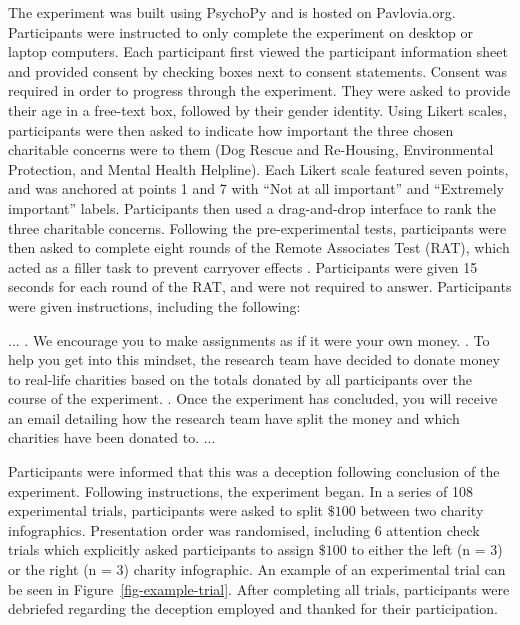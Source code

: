 \documentclass[
  authoryear,
  preprint,
  3p]{elsarticle}
\begin{document}
The experiment was built using PsychoPy \citep{peirce_2019} and is
hosted on Pavlovia.org. Participants were instructed to only complete
the experiment on desktop or laptop computers. Each participant first
viewed the participant information sheet and provided consent by
checking boxes next to consent statements. Consent was required in order
to progress through the experiment. They were asked to provide their age
in a free-text box, followed by their gender identity. Using Likert
scales, participants were then asked to indicate how important the three
chosen charitable concerns were to them (Dog Rescue and Re-Housing,
Environmental Protection, and Mental Health Helpline). Each Likert scale
featured seven points, and was anchored at points 1 and 7 with ``Not at
all important'' and ``Extremely important'' labels. Participants then
used a drag-and-drop interface to rank the three charitable concerns.
Following the pre-experimental tests, participants were then asked to
complete eight rounds of the Remote Associates Test (RAT), which acted
as a filler task to prevent carryover effects \citep{she_2023}.
Participants were given 15 seconds for each round of the RAT, and were
not required to answer. Participants were given instructions, including
the following:

\hspace{0pt}
\begin{tcolorbox}[colback=gray!10, colframe=gray!50, boxrule=0.5pt]
...
. We encourage you to make assignments as if it were your own money.
  . To help you get into this mindset, the research team have decided to donate money to real-life charities based on the totals donated by all participants over the course of the experiment.
  . Once the experiment has concluded, you will receive an email detailing how the research team have split the money and which charities have been donated to.
  \newline
  ...
\end{tcolorbox}
\hspace{0pt}

Participants were informed that this was a deception following
conclusion of the experiment. Following instructions, the experiment
began. In a series of 108 experimental trials, participants were asked
to split \(\$100\) between two charity infographics. Presentation order
was randomised, including 6 attention check trials which explicitly
asked participants to assign \(\$100\) to either the left (n = 3) or the
right (n = 3) charity infographic. An example of an experimental trial
can be seen in Figure~\ref{fig-example-trial}. After completing all
trials, participants were debriefed regarding the deception employed and
thanked for their participation.
\end{document}
